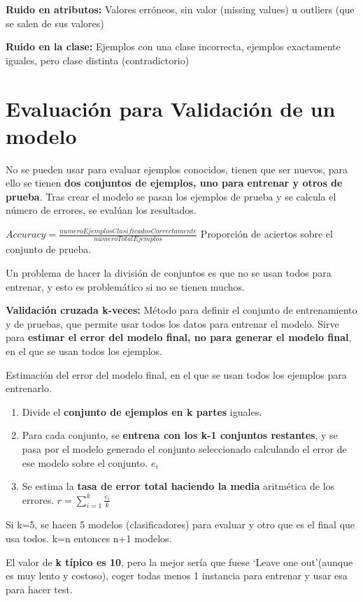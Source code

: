 \documentclass[12pt, twoside, openright]{report} %
\begin{document}
\textbf{Ruido en atributos:} Valores erróneos, sin valor (missing values) u outliers (que se salen de sus valores)

\textbf{Ruido en la clase:} Ejemplos con una clase incorrecta, ejemplos exactamente iguales, pero clase distinta (contradictorio)

\section{Evaluación para Validación de un modelo}

No se pueden usar para evaluar ejemplos conocidos, tienen que ser nuevos, para ello se tienen \textbf{dos conjuntos de ejemplos, uno para entrenar y otros de prueba}. Tras crear el modelo se pasan los ejemplos de prueba y se calcula el número de errores, se evalúan los resultados.

$Accuracy= \frac {numeroEjemplosClasificadosCorrectamente}{numeroTotalEjemplos}$ Proporción de aciertos sobre el conjunto de prueba.

Un problema de hacer la división de conjuntos es que no se usan todos para entrenar, y esto es problemático si no se tienen muchos.

\textbf{Validación cruzada k-veces:} Método para definir el conjunto de entrenamiento y de pruebas, que permite usar todos los datos para entrenar el modelo. Sirve para \textbf{estimar el error del modelo final, no para generar el modelo final}, en el que se usan todos los ejemplos.

Estimación del error del modelo final, en el que se usan todos los ejemplos para entrenarlo.

\begin{enumerate}
	\def\labelenumi{\arabic{enumi}.}
	\item Divide el \textbf{conjunto de ejemplos en k partes} iguales.
	\item Para cada conjunto, se \textbf{entrena con los k-1 conjuntos restantes}, y se pasa por el modelo generado el conjunto seleccionado calculando el error de ese modelo sobre el conjunto. \(e_i\)
	\item Se estima la \textbf{tasa de error total haciendo la media} aritmética de los errores. \(r= \sum_{i=1}^k \frac {e_i}{k}\)
\end{enumerate}

Si k=5, se hacen 5 modelos (clasificadores) para evaluar y otro que es el final que usa todos. k=n entonces n+1 modelos.

El valor de \textbf{k típico es 10}, pero la mejor sería que fuese ‘Leave one out’(aunque es muy lento y costoso), coger todas menos 1 instancia para entrenar y usar esa para hacer test.
\end{document}
